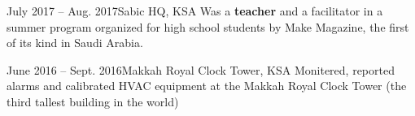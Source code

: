 \documentclass[10pt,a4paper]{altacv}
\begin{document}


\begin{fullwidth}
\makecvheader
\end{fullwidth}



{July 2017 -- Aug. 2017}{Sabic HQ, KSA}
Was a \textbf{teacher} and a facilitator in a summer program organized for high school students by Make Magazine, the first of its kind in Saudi Arabia.


{June 2016 -- Sept. 2016}{Makkah Royal Clock Tower, KSA}
Monitered, reported alarms and calibrated HVAC equipment at the Makkah Royal Clock Tower (the third tallest building in the world)

\end{document}
